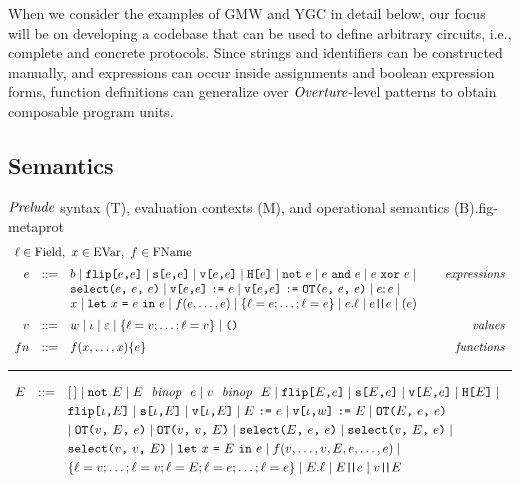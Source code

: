 When we consider the examples of GMW and YGC in detail below, our
focus will be on developing a codebase that can be used to define
arbitrary circuits, i.e., complete and concrete protocols. Since
strings and identifiers can be constructed manually, and expressions
can occur inside assignments and boolean expression forms, function
definitions can generalize over $\mathit{Overture}$-level patterns to obtain
composable program units.

\subsection{Semantics}

\begin{fpfig}[t]{$\mathit{Prelude}$ syntax (T), evaluation contexts (M), and operational semantics (B).}{fig-metaprot}
    {\small
    $$
    \begin{array}{rcl@{\hspace{8mm}}r}
      \multicolumn{3}{l}{\flab \in \mathrm{Field},\   x \in \mathrm{EVar}, \  f \in \mathrm{FName}}\\[2mm]
      e &::=& b \mid \flip{e}{e} \mid \secret{e}{e} \mid \view{e}{e} \mid \oracle{e} \mid \enot\ e \mid e\ \eand\ e \mid e\ \exor\ e \mid & \textit{expressions}\\[0mm]
      & & \select{e}{e}{e} \mid 
      \send{\view{e}{e}}{e} \mid \send{\view{e}{e}}{\OT{e}{e}{e}} \mid e;e \mid \\[0mm]
      & & x \mid \elet{x}{e}{e} \mid f(e,\ldots,e) \mid \{ \flab = e; \ldots; \flab = e \}
      \mid e.\flab \mid e\concat e \mid (e) \\[2mm]
      v &::=& w \mid \cid \mid \be \mid \{ \flab = v;\ldots;\flab = v \} 
      \mid \ttt{()} & \textit{values}\\[2mm]
           {fn} &::=& f(x,\ldots,x) \{ e \} & \textit{functions}
    \end{array}
    $$
    }

    \rule{130mm}{0.5pt}

    {\small
    $$
    \begin{array}{rcl@{\hspace{3mm}}r}
      E &::=& [\,] \mid \enot\ E \mid E\ \bop\ e \mid v\ \bop\ E \mid  \flip{E}{e} \mid \secret{E}{e} \mid \view{E}{e} \mid \oracle{E} \mid  \\[1mm]
      & & \flip{\cid}{E} \mid \secret{\cid}{E} \mid \view{\cid}{E} \mid \send{E}{e} \mid \send{\view{\cid}{w}}{E} \mid \OT{E}{e}{e} \\[1mm]
      & & \mid \OT{v}{E}{e} \mid \OT{v}{v}{E} \mid \select{E}{e}{e} \mid \select{v}{E}{e} \mid \\[1mm]
      & & \select{v}{v}{E} \mid \elet{x}{E}{e} \mid f(v,\ldots,v,E,e,\ldots,e) \mid \\[1mm]
      & & \{ \flab = v;\ldots;\flab = v;\flab = E;\flab = e;\ldots;\flab = e \} \mid E.\flab \mid E\concat e \mid v \concat E
    \end{array}
    $$
    \vspace{.5mm}
    
}
\end{fpfig}
